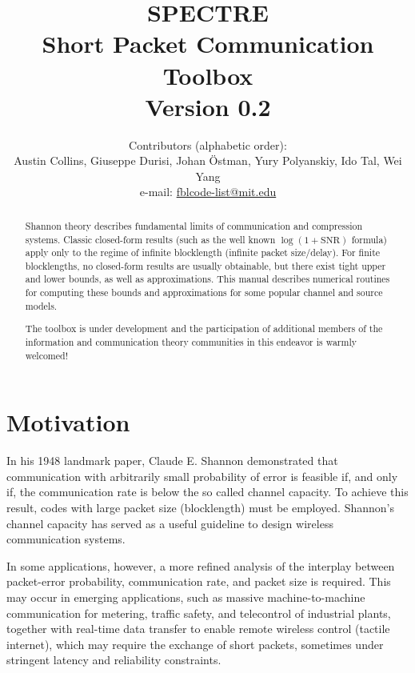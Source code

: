 \documentclass[a4paper,11p]{memoir}
\begin{document}
\title{SPECTRE\\
Short Packet Communication Toolbox\\[1cm]
Version 0.2}

\author{Contributors (alphabetic order):\\
Austin Collins, Giuseppe Durisi, Johan \"Ostman, Yury Polyanskiy, Ido Tal, Wei Yang\\[10pt]
e-mail: \url{fblcode-list@mit.edu}}




\maketitle

\begin{abstract}

Shannon theory describes fundamental limits of communication and
compression systems. Classic closed-form results
(such as the well known $\log(1+\mathrm{SNR})$ formula)   apply only to the regime of infinite blocklength
(infinite packet size/delay). For finite blocklengths, no closed-form results are usually
obtainable, but there  exist tight upper and lower bounds, as well as
approximations. This manual describes numerical routines for  computing
these bounds and approximations for some popular channel and
source models.

The toolbox is under development and the participation of additional
members of the information and communication theory communities in
this endeavor is warmly welcomed!
\end{abstract}
\newpage
\tableofcontents

\newpage
\chapter{Motivation}
%
  In his 1948 landmark paper, Claude E. Shannon demonstrated that communication with arbitrarily small probability of error is feasible if, and only if, the communication rate is below the so called channel capacity. 
  To achieve this result, codes with large packet size (blocklength) must be employed. 
 Shannon's channel capacity has served as a useful guideline to design wireless communication systems.

In some applications, however, a more refined analysis of the interplay between packet-error probability, communication rate, and packet size is required.
  This may occur in emerging applications, such as massive machine-to-machine communication for metering, traffic safety, and telecontrol of industrial plants, together with real-time data transfer to enable remote wireless control (tactile internet), which may require the exchange of short packets, sometimes under stringent latency and reliability constraints.
  
\end{document}
